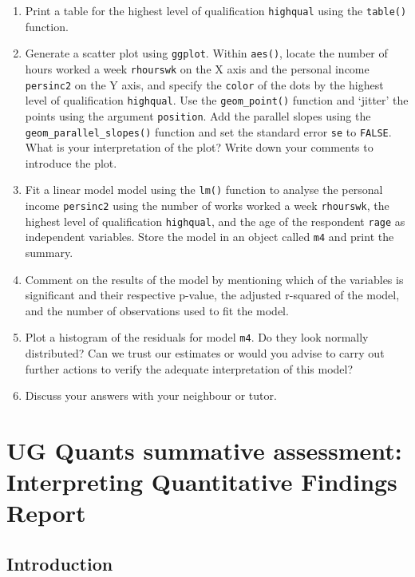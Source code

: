\documentclass[
]{book}
\providecommand{\tightlist}{%
  \setlength{\itemsep}{0pt}\setlength{\parskip}{0pt}}
\begin{document}
\begin{enumerate}
\def\labelenumi{\arabic{enumi}.}
\setcounter{enumi}{1}
\tightlist
\item
  Print a table for the highest level of qualification \texttt{highqual} using the \texttt{table()} function.
\item
  Generate a scatter plot using \texttt{ggplot}. Within \texttt{aes()}, locate the number of hours worked a week \texttt{rhourswk} on the X axis and the personal income \texttt{persinc2} on the Y axis, and specify the \texttt{color} of the dots by the highest level of qualification \texttt{highqual}. Use the \texttt{geom\_point()} function and `jitter' the points using the argument \texttt{position}. Add the parallel slopes using the \texttt{geom\_parallel\_slopes()} function and set the standard error \texttt{se} to \texttt{FALSE}. What is your interpretation of the plot? Write down your comments to introduce the plot.
\item
  Fit a linear model model using the \texttt{lm()} function to analyse the personal income \texttt{persinc2} using the number of works worked a week \texttt{rhourswk}, the highest level of qualification \texttt{highqual}, and the age of the respondent \texttt{rage} as independent variables. Store the model in an object called \texttt{m4} and print the summary.
\item
  Comment on the results of the model by mentioning which of the variables is significant and their respective p-value, the adjusted r-squared of the model, and the number of observations used to fit the model.
\item
  Plot a histogram of the residuals for model \texttt{m4}. Do they look normally distributed? Can we trust our estimates or would you advise to carry out further actions to verify the adequate interpretation of this model?
\item
  Discuss your answers with your neighbour or tutor.
\end{enumerate}

\hypertarget{ug-quants-summative-assessment-interpreting-quantitative-findings-report}{%
\chapter{UG Quants summative assessment: Interpreting Quantitative Findings Report}\label{ug-quants-summative-assessment-interpreting-quantitative-findings-report}}

\hypertarget{introduction-3}{%
\section{Introduction}\label{introduction-3}}
\end{document}
